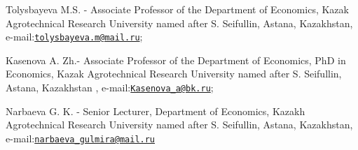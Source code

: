 Tolysbayeva M.S. - Associate Professor of the Department of Economics,
Kazak Agrotechnical Research University named after S. Seifullin,
Astana, Kazakhstan,
e-mail:\href{mailto:tolysbayeva.m@mail.ru}{\nolinkurl{tolysbayeva.m@mail.ru}};

Kasenova A. Zh.- Associate Professor of the Department of Economics, PhD
in Economics, Kazak Agrotechnical Research University named after S.
Seifullin, Astana, Kazakhstan ,
e-mail:\href{mailto:Kasenova_a@bk.ru}{\nolinkurl{Kasenova\_a@bk.ru}};

Narbaeva G. K. - Senior Lecturer, Department of Economics, Kazakh
Agrotechnical Research University named after S. Seifullin, Astana,
Kazakhstan,
e-mail:\href{mailto:narbaeva_gulmira@mail.ru}{\nolinkurl{narbaeva\_gulmira@mail.ru}}\
